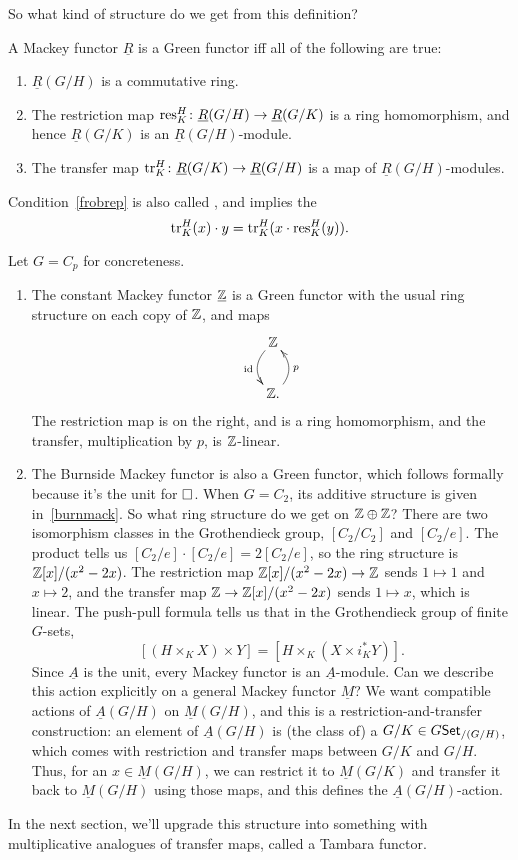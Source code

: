 So what kind of structure do we get from this definition?
\begin{prop}
A Mackey functor $\underline R$ is a Green functor iff all of the following are true:
\begin{enumerate}
	\item $\underline R(G/H)$ is a commutative ring.
	\item The restriction map $\operatorname{res}_K^H\colon \underline R(G/H)\to \underline R(G/K)$ is a ring homomorphism, and
	hence $\underline R(G/K)$ is an $\underline R(G/H)$-module.
	\item\label{frobrep} The transfer map $\operatorname{tr}_K^H\colon \underline R(G/K)\to \underline R(G/H)$ is a map of
	$\underline R(G/H)$-modules.
\end{enumerate}
\end{prop}
Condition~\eqref{frobrep} is also called , and implies the 
\[\operatorname{tr}_K^H(x)\cdot y = \operatorname{tr}_K^H(x\cdot\operatorname{res}_K^H(y)).\]
\begin{exm}
Let $G = C_p$ for concreteness.
\begin{enumerate}
	\item The constant Mackey functor $\underline{\mathbb Z}$ is a Green functor with the usual ring structure on each copy
	of $\mathbb Z$, and maps
	\[\xymatrix{
		\Z\ar@/_0.4cm/[d]_\id\\
		\Z.\ar@/_0.4cm/[u]_p
	}\]
	The restriction map is on the right, and is a ring homomorphism, and the transfer, multiplication by $p$, is
	$\mathbb Z$-linear.
	\item The Burnside Mackey functor is also a Green functor, which follows formally because it's the unit for
	$\mathbin\square$. When $G = C_2$, its additive structure is given in~\eqref{burnmack}. So what ring structure do we
	get on $\mathbb Z\oplus\mathbb Z$? There are two isomorphism classes in the Grothendieck group, $[C_2/C_2]$ and $[C_2/e]$.
	The product tells us $[C_2/e]\cdot [C_2/e] = 2[C_2/e]$, so the ring structure is $\mathbb Z[x]/(x^2-2x)$. The
	restriction map $\mathbb Z[x]/(x^2-2x)\to\mathbb Z$ sends $1\mapsto 1$ and $x\mapsto 2$, and the transfer map
	$\mathbb Z\to\mathbb Z[x]/(x^2-2x)$ sends $1\mapsto x$, which is linear. The push-pull formula tells us that in the
	Grothendieck group of finite $G$-sets,
	\[[(H\times_K X)\times Y] = [H\times_K (X\times i_K^*Y)].\]
	Since $\underline A$ is the unit, every Mackey functor is an $\underline A$-module. Can we describe this action
	explicitly on a general Mackey functor $\underline M$? We want compatible actions of $\underline A(G/H)$ on
	$\underline M(G/H)$, and this is a restriction-and-transfer construction: an element of $\underline A(G/H)$ is
	(the class of) a $G/K\in G\mathsf{Set}_{/(G/H)}$, which comes with restriction and transfer maps between $G/K$ and
	$G/H$. Thus, for an $x\in\underline M(G/H)$, we can restrict it to $\underline M(G/K)$ and transfer it back to
	$\underline M(G/H)$ using those maps, and this defines the $\underline A(G/H)$-action.\qedhere
\end{enumerate}
\end{exm}
In the next section, we'll upgrade this structure into something with multiplicative analogues of transfer maps,
called a Tambara functor.
